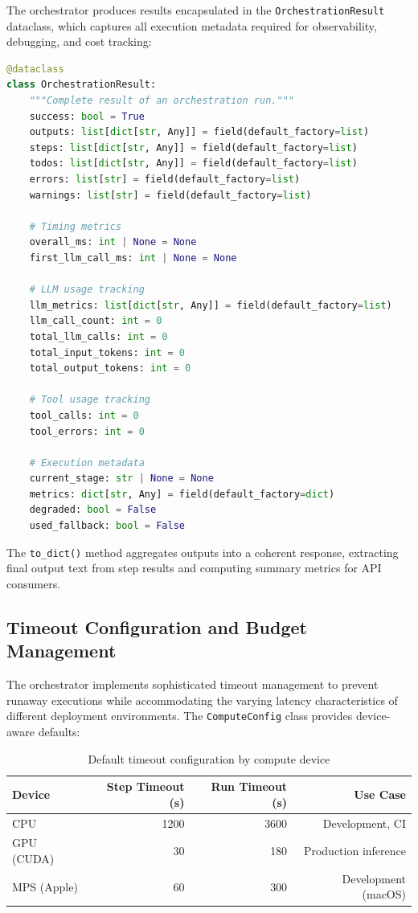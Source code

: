 The orchestrator produces results encapsulated in the \texttt{OrchestrationResult} dataclass, which captures all execution metadata required for observability, debugging, and cost tracking:

\begin{lstlisting}[language=Python, caption={OrchestrationResult dataclass structure}, label=lst:orchestration-result]
@dataclass
class OrchestrationResult:
    """Complete result of an orchestration run."""
    success: bool = True
    outputs: list[dict[str, Any]] = field(default_factory=list)
    steps: list[dict[str, Any]] = field(default_factory=list)
    todos: list[dict[str, Any]] = field(default_factory=list)
    errors: list[str] = field(default_factory=list)
    warnings: list[str] = field(default_factory=list)
    
    # Timing metrics
    overall_ms: int | None = None
    first_llm_call_ms: int | None = None
    
    # LLM usage tracking
    llm_metrics: list[dict[str, Any]] = field(default_factory=list)
    llm_call_count: int = 0
    total_llm_calls: int = 0
    total_input_tokens: int = 0
    total_output_tokens: int = 0
    
    # Tool usage tracking
    tool_calls: int = 0
    tool_errors: int = 0
    
    # Execution metadata
    current_stage: str | None = None
    metrics: dict[str, Any] = field(default_factory=dict)
    degraded: bool = False
    used_fallback: bool = False
\end{lstlisting}

The \texttt{to\_dict()} method aggregates outputs into a coherent response, extracting final output text from step results and computing summary metrics for API consumers.

\subsection{Timeout Configuration and Budget Management}

The orchestrator implements sophisticated timeout management to prevent runaway executions while accommodating the varying latency characteristics of different deployment environments. The \texttt{ComputeConfig} class provides device-aware defaults:

\begin{table}[htbp]
\centering
\caption{Default timeout configuration by compute device}
\label{tab:timeout-config}
\begin{tabular}{lrrr}
\hline
\textbf{Device} & \textbf{Step Timeout (s)} & \textbf{Run Timeout (s)} & \textbf{Use Case} \\
\hline
CPU & 1200 & 3600 & Development, CI \\
GPU (CUDA) & 30 & 180 & Production inference \\
MPS (Apple) & 60 & 300 & Development (macOS) \\
\hline
\end{tabular}
\end{table}

